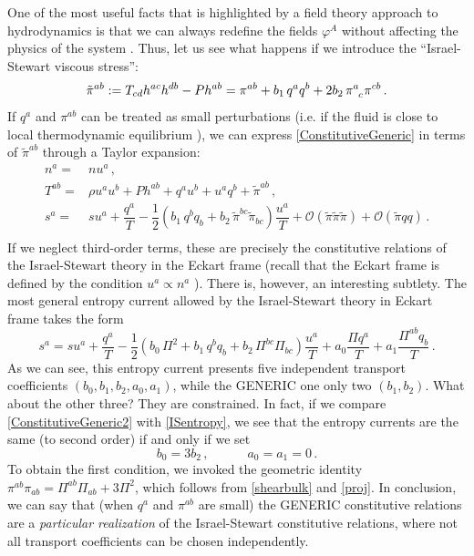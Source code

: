 \documentclass[a4paper, amsfonts, amssymb, amsmath, reprint, showkeys, nofootinbib, twoside, onecolumn, notitlepage]{revtex4-1}
\newcommand{\spc}{\quad \quad \quad}
\theoremstyle{definition}
\theoremstyle{theorem}
\begin{document}
One of the most useful facts that is highlighted by a field theory approach to hydrodynamics is that we can always redefine the fields $\varphi^A$ without affecting the physics of the system \cite{GavassinoQuasi2022}. 
Thus, let us see what happens if we introduce the ``Israel-Stewart viscous stress'':
\begin{equation}\label{israelfieldredef}
\tilde{\pi}^{ab}:=T_{cd} h^{ac}h^{db}-Ph^{ab}= \pi^{ab}+ b_1 \, q^a q^b + 2b_2 \, \pi\indices{^a _c}\pi\indices{^c ^b} \, .
\end{equation}
If $q^a$ and $\pi^{ab}$ can be treated as small perturbations (i.e. if the fluid is close to local thermodynamic equilibrium \cite{GavassinoFronntiers2021}), we can express \eqref{ConstitutiveGeneric} in terms of $\tilde{\pi}^{ab}$ through a Taylor expansion:
\begin{equation}\label{ConstitutiveGeneric2}
\begin{split}
n^a ={}& n u^a \, , \\
 T^{ab} ={}& \rho u^a u^b +P h^{ab}+q^a u^b+ u^a q^b+\tilde{\pi}^{ab} \, , \\
 s^a ={}& s u^a +\dfrac{q^a}{T} - \dfrac{1}{2}  (b_1 \, q^b q_b +b_2 \, \tilde{\pi}^{bc}\tilde{\pi}_{bc})\dfrac{u^a}{T} + \mathcal{O}(\tilde{\pi}\tilde{\pi}\tilde{\pi})+\mathcal{O}(\tilde{\pi} qq) \, . \\
\end{split}
\end{equation}
If we neglect third-order terms, these are precisely the constitutive relations of the Israel-Stewart theory  in the Eckart frame  (recall that the Eckart frame is defined by the condition $u^a \propto n^a$ \cite{Kovtun2019}). There is, however, an interesting subtlety. The most general entropy current allowed by the Israel-Stewart theory in Eckart frame takes the form \cite{Hishcock1983}
\begin{equation}\label{ISentropy}
 s^a = s u^a +\dfrac{q^a}{T} - \dfrac{1}{2}  (b_0 \, \Pi^2 +b_1 \, q^b q_b +b_2 \, \Pi^{bc}\Pi_{bc})\dfrac{u^a}{T} + a_0 \dfrac{\Pi q^a}{T} + a_1 \dfrac{\Pi^{ab}q_b}{T}  \, .
\end{equation}
As we can see, this entropy current presents five independent transport coefficients $(b_0,b_1,b_2,a_0,a_1)$, while the GENERIC one only two $( b_1,b_2 )$. What about the other three? They are constrained. In fact, if we compare \eqref{ConstitutiveGeneric2} with \eqref{ISentropy}, we see that the entropy currents are the same (to second order) if and only if we set
\begin{equation}
\label{constuo}
b_0 = 3b_2 \, , \spc a_0=a_1=0 \, .
\end{equation}
To obtain the first condition, we invoked the geometric identity $\pi^{ab}\pi_{ab}=\Pi^{ab}\Pi_{ab}+3\Pi^2$, which follows from \eqref{shearbulk} and \eqref{proj}. In conclusion, we can say that  (when $q^a$ and $\pi^{ab}$ are small) the GENERIC constitutive relations are a \textit{particular realization} of the Israel-Stewart constitutive relations, where not all transport coefficients can be chosen independently.
\end{document}
